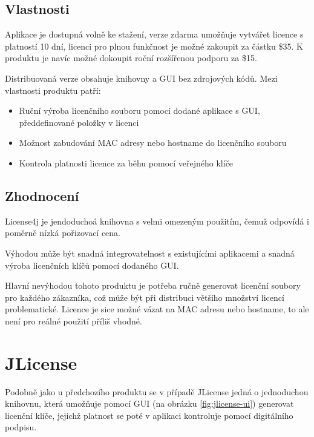 \subsection*{Vlastnosti}
Aplikace je dostupná volně ke stažení, verze zdarma umožňuje vytvářet licence s
platností 10 dní, licenci pro plnou funkčnost je možné zakoupit za částku \$35.
K produktu je navíc možné dokoupit roční rozšířenou podporu za \$15.

Distribuovaná verze obsahuje knihovny a \gls{GUI} bez zdrojových kódů. Mezi
vlastnosti produktu patří:

\begin{itemize}
  \item Ruční výroba licenčního souboru pomocí dodané aplikace s \gls{GUI},
  předdefinované položky v licenci
  \item Možnost zabudování \gls{MAC} adresy nebo hostname do licenčního souboru
  \item Kontrola platnosti licence za běhu pomocí veřejného klíče 
\end{itemize}

\subsection*{Zhodnocení}
License4j je jendoduchoá knihovna s velmi omezeným použitím, čemuž odpovídá i
poměrně nízká pořizovací cena. 

Výhodou může být snadná integrovatelnost s existujícími aplikacemi a snadná
výroba licenčních klíčů pomocí dodaného \gls{GUI}.

Hlavní nevýhodou tohoto produktu je potřeba ručně generovat licenční soubory
pro každého zákazníka, což může být při distribuci většího množství licencí
problematické. Licence je sice možné vázat na \gls{MAC} adresu nebo hostname, to
ale není pro reálné použití příliš vhodné.


\section{JLicense}
Podobně jako u předchozího produktu se v případě JLicense\cite{jlicense} jedná o
jednoduchou knihovnu, která umožňuje pomocí \gls{GUI} (na obrázku \ref{fig:jlicense-ui})
generovat licenční klíče, jejichž platnost se poté v aplikaci kontroluje pomocí digitálního podpisu.

